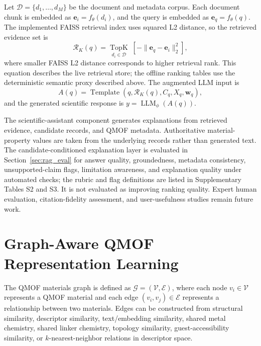 \documentclass[12pt,a4paper]{article}
\begin{document}
Let $\mathcal{D} = \{d_1, \ldots, d_M\}$ be the document and metadata corpus. Each document chunk is embedded as $\mathbf{e}_i = f_\theta(d_i)$, and the query is embedded as $\mathbf{e}_q = f_\theta(q)$. The implemented FAISS retrieval index uses squared L2 distance, so the retrieved evidence set is
\begin{equation}
  \mathcal{R}_K(q) = \underset{d_i\in\mathcal{D}}{\operatorname{TopK}}\;[-\|\mathbf{e}_q-\mathbf{e}_i\|_2^2],
\end{equation}
where smaller FAISS L2 distance corresponds to higher retrieval rank. This equation describes the live retrieval store; the offline ranking tables use the deterministic semantic proxy described above.
The augmented LLM input is
\begin{equation}
  A(q) = \operatorname{Template}(q, \mathcal{R}_K(q), C_q, X_q, \mathbf{w}_q),
\end{equation}
and the generated scientific response is $y = \operatorname{LLM}_\phi(A(q))$.

The scientific-assistant component generates explanations from retrieved evidence, candidate records, and QMOF metadata. Authoritative material-property values are taken from the underlying records rather than generated text. The candidate-conditioned explanation layer is evaluated in Section~\ref{sec:rag_eval} for answer quality, groundedness, metadata consistency, unsupported-claim flags, limitation awareness, and explanation quality under automated checks; the rubric and flag definitions are listed in Supplementary Tables S2 and S3. It is not evaluated as improving ranking quality. Expert human evaluation, citation-fidelity assessment, and user-usefulness studies remain future work.

\section{Graph-Aware QMOF Representation Learning}
\label{sec:graph}

The QMOF materials graph is defined as $\mathcal{G} = (\mathcal{V}, \mathcal{E})$, where each node $v_i \in \mathcal{V}$ represents a QMOF material and each edge $(v_i, v_j) \in \mathcal{E}$ represents a relationship between two materials. Edges can be constructed from structural similarity, descriptor similarity, text/embedding similarity, shared metal chemistry, shared linker chemistry, topology similarity, guest-accessibility similarity, or $k$-nearest-neighbor relations in descriptor space.
\end{document}
